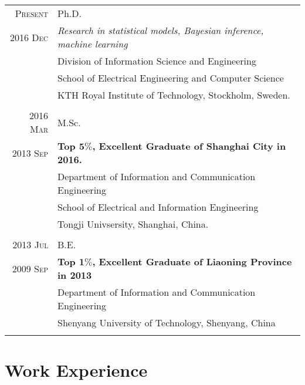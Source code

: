\documentclass[a4paper,10pt]{article}
\begin{document}
\begin{tabular}{r|p{13cm}}

  \textsc{Present} 	& Ph.D. \\
  \textsc{2016 Dec} 	& \emph{Research in statistical models, Bayesian inference, machine learning} \\
                    & { Division of Information Science and Engineering
                      } \\
                    & {School of Electrical Engineering and Computer Science} \\
                    & {KTH Royal Institute of Technology, Stockholm, Sweden.} \\
  \multicolumn{2}{c}{} \\


  \textsc{2016 Mar} 	& M.Sc. \\
  \textsc{2013 Sep}  & \textbf{Top $\mathbf{5\%}$, Excellent Graduate of Shanghai City in 2016.}\\
                    & {Department of Information and Communication Engineering} \\
                    & {School of Electrical and Information Engineering} \\
                    & {Tongji Univsersity, Shanghai, China.}\\
  \multicolumn{2}{c}{} \\


  \textsc{2013 Jul} 	& B.E. \\
  \textsc{2009 Sep} & \textbf{Top $\mathbf{1\%}$, Excellent Graduate of Liaoning Province in 2013}\\
                    & {Department of Information and Communication Engineering}\\
                    & {Shenyang University of Technology, Shenyang, China} \\
  \multicolumn{2}{c}{}\\

\end{tabular}


\section{Work Experience}
\end{document}
